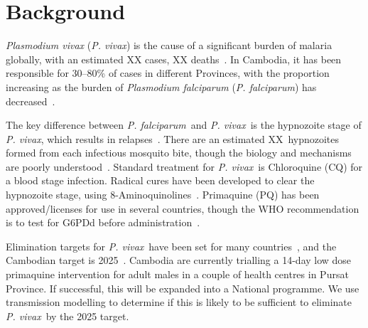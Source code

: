\documentclass[doublespacing]{bmcart}
\newcommand{\pv}{\textit{P. vivax}}
\newcommand{\pf}{\textit{P. falciparum}}
\begin{document}

\section*{Background} 

\textit{Plasmodium vivax} (\pv) is the cause of a significant burden of malaria globally, with an estimated XX cases, XX deaths~\cite{WHOreport}. In Cambodia, it has been responsible for 30--80\% of cases in different Provinces, with the proportion increasing as the burden of \textit{Plasmodium falciparum} (\pf) has decreased~\cite{Pengby}.

The key difference between \pf~and \pv~is the hypnozoite stage of \pv, which results in relapses~\cite{biologyofvivax}. There are an estimated XX~hypnozoites formed from each infectious mosquito bite, though the biology and mechanisms are poorly understood~\cite{vivaxbiology}. Standard treatment for \pv~is Chloroquine (CQ) for a blood stage infection. Radical cures have been developed to clear the hypnozoite stage, using 8-Aminoquinolines~\cite{RicPrice}. Primaquine (PQ) has been approved/licenses for use in several countries, though the WHO recommendation is to test for G6PDd before administration~\cite{WHOguidelines}. 

Elimination targets for \pv~have been set for many countries~\cite{WHO}, and the Cambodian target is 2025~\cite{Cambodia}. Cambodia are currently trialling a 14-day low dose primaquine intervention for adult males in a couple of health centres in Pursat Province. If successful, this will be expanded into a National programme. We use transmission modelling to determine if this is likely to be sufficient to eliminate \pv~by the 2025 target. 

%
\end{document}
